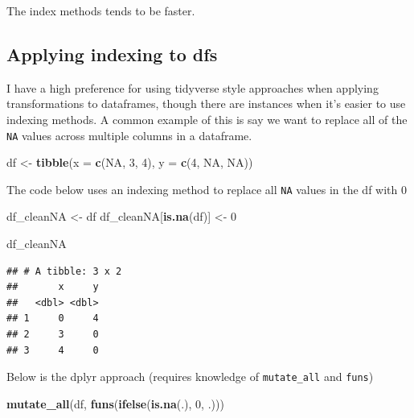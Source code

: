 \documentclass[]{book}
\newenvironment{Shaded}{\begin{snugshade}}{\end{snugshade}}
\newcommand{\DataTypeTok}[1]{\textcolor[rgb]{0.13,0.29,0.53}{#1}}
\newcommand{\DecValTok}[1]{\textcolor[rgb]{0.00,0.00,0.81}{#1}}
\newcommand{\KeywordTok}[1]{\textcolor[rgb]{0.13,0.29,0.53}{\textbf{#1}}}
\newcommand{\NormalTok}[1]{#1}
\newcommand{\OtherTok}[1]{\textcolor[rgb]{0.56,0.35,0.01}{#1}}
\newcommand{\StringTok}[1]{\textcolor[rgb]{0.31,0.60,0.02}{#1}}
\theoremstyle{definition}
\theoremstyle{definition}
\theoremstyle{definition}
\theoremstyle{remark}
\begin{document}
The index methods tends to be faster.

\hypertarget{applying-indexing-to-dfs}{%
\subsection{Applying indexing to dfs}\label{applying-indexing-to-dfs}}

I have a high preference for using tidyverse style approaches when
applying transformations to dataframes, though there are instances when
it's easier to use indexing methods. A common example of this is say we
want to replace all of the \texttt{NA} values across multiple columns in
a dataframe.

\begin{Shaded}
\begin{Highlighting}[]
\NormalTok{df <-}\StringTok{ }\KeywordTok{tibble}\NormalTok{(}\DataTypeTok{x =} \KeywordTok{c}\NormalTok{(}\OtherTok{NA}\NormalTok{, }\DecValTok{3}\NormalTok{, }\DecValTok{4}\NormalTok{),}
       \DataTypeTok{y =} \KeywordTok{c}\NormalTok{(}\DecValTok{4}\NormalTok{, }\OtherTok{NA}\NormalTok{, }\OtherTok{NA}\NormalTok{))}
\end{Highlighting}
\end{Shaded}

The code below uses an indexing method to replace all \texttt{NA} values
in the df with 0

\begin{Shaded}
\begin{Highlighting}[]
\NormalTok{df_cleanNA <-}\StringTok{ }\NormalTok{df}
\NormalTok{df_cleanNA[}\KeywordTok{is.na}\NormalTok{(df)] <-}\StringTok{ }\DecValTok{0}

\NormalTok{df_cleanNA}
\end{Highlighting}
\end{Shaded}

\begin{verbatim}
## # A tibble: 3 x 2
##       x     y
##   <dbl> <dbl>
## 1     0     4
## 2     3     0
## 3     4     0
\end{verbatim}

Below is the dplyr approach (requires knowledge of \texttt{mutate\_all}
and \texttt{funs})

\begin{Shaded}
\begin{Highlighting}[]
\KeywordTok{mutate_all}\NormalTok{(df, }\KeywordTok{funs}\NormalTok{(}\KeywordTok{ifelse}\NormalTok{(}\KeywordTok{is.na}\NormalTok{(.), }\DecValTok{0}\NormalTok{, .)))}
\end{Highlighting}
\end{Shaded}
\end{document}
